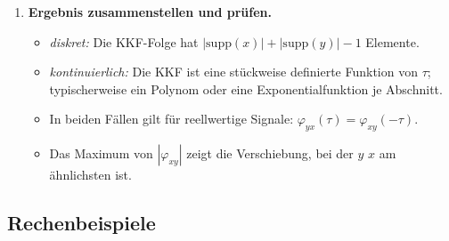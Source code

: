 \begin{enumerate}
  \item \textbf{Ergebnis zusammenstellen und prüfen.}
  \begin{itemize}
    \item \textit{diskret:} Die KKF-Folge hat
          $|\mathrm{supp}(x)| + |\mathrm{supp}(y)| - 1$ Elemente.
    \item \textit{kontinuierlich:} Die KKF ist eine stückweise definierte Funktion
          von $\tau$; typischerweise ein Polynom oder eine Exponentialfunktion
          je Abschnitt.
    \item In beiden Fällen gilt für reellwertige Signale:
          $\varphi_{yx}(\tau) = \varphi_{xy}(-\tau)$.
    \item Das Maximum von $|\varphi_{xy}|$ zeigt die Verschiebung,
          bei der $y$ $x$ am ähnlichsten ist.
  \end{itemize}

\end{enumerate}

\newpage
\subsection*{Rechenbeispiele}

